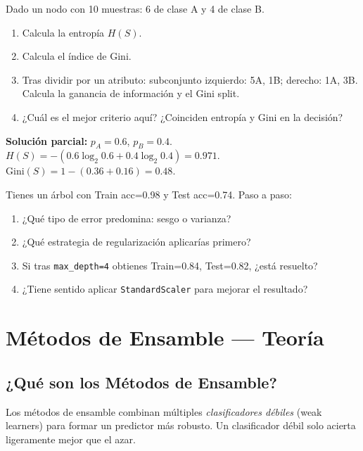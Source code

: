 \documentclass[11pt, a4paper]{book}
\begin{document}
\begin{ejercicio}
  Dado un nodo con 10 muestras: 6 de clase A y 4 de clase B.
  \begin{enumerate}
    \item Calcula la entropía $H(S)$.
    \item Calcula el índice de Gini.
    \item Tras dividir por un atributo: subconjunto izquierdo: 5A, 1B; derecho: 1A, 3B.
          Calcula la ganancia de información y el Gini split.
    \item ¿Cuál es el mejor criterio aquí? ¿Coinciden entropía y Gini en la decisión?
  \end{enumerate}
  \tcblower
  \textbf{Solución parcial:} $p_A=0.6$, $p_B=0.4$.
  $H(S) = -(0.6\log_2 0.6 + 0.4\log_2 0.4) = 0.971$.
  $\text{Gini}(S) = 1-(0.36+0.16)=0.48$.
\end{ejercicio}

\begin{ejercicio}
  Tienes un árbol con Train acc=0.98 y Test acc=0.74. Paso a paso:
  \begin{enumerate}
    \item ¿Qué tipo de error predomina: sesgo o varianza?
    \item ¿Qué estrategia de regularización aplicarías primero?
    \item Si tras \texttt{max\_depth=4} obtienes Train=0.84, Test=0.82, ¿está resuelto?
    \item ¿Tiene sentido aplicar \texttt{StandardScaler} para mejorar el resultado?
  \end{enumerate}
\end{ejercicio}

\chapter{Métodos de Ensamble — Teoría}

\section{¿Qué son los Métodos de Ensamble?}

Los métodos de ensamble combinan múltiples \textit{clasificadores débiles} (weak learners)
para formar un predictor más robusto. Un clasificador débil solo acierta ligeramente mejor
que el azar.
\end{document}
